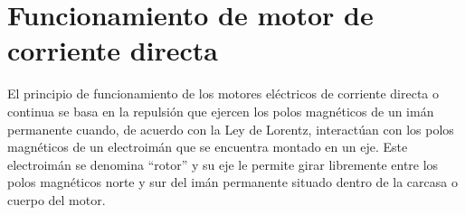 \documentclass[12pt,a4paper]{article}
\begin{document}
\section{Funcionamiento de motor de corriente directa}
El principio de funcionamiento de los motores eléctricos de corriente directa o continua se basa en la repulsión que ejercen los polos magnéticos de un imán permanente cuando, de acuerdo con la Ley de Lorentz, interactúan con los polos magnéticos de un electroimán que se encuentra montado en un eje. Este electroimán se denomina “rotor” y su eje le permite girar libremente entre los polos magnéticos norte y sur del imán permanente situado dentro de la carcasa o cuerpo del motor.
\end{document}
